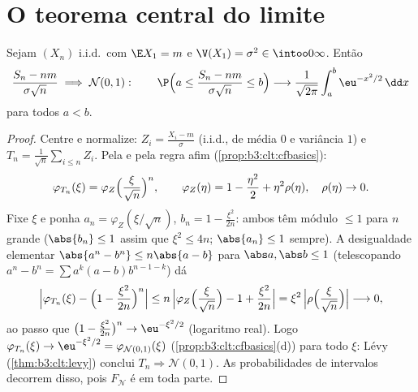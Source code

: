 \section{O teorema central do limite}

\begin{theorem}\label{thm:b3:clt:clt}
Sejam $(X_n)$ i.i.d.\ com $\E X_1 = m$ e $\V(X_1) =
\sigma^2 \in \intoo0\infty$. Então
\[
\frac{S_n - nm}{\sigma\sqrt n} \;\Longrightarrow\; \mathcal
N(0, 1) :
\qquad
\P\Bigl(a \leq \frac{S_n - nm}{\sigma\sqrt n} \leq
b\Bigr) \longrightarrow
\frac{1}{\sqrt{2\pi}}\int_a^b\eu^{-x^2/2}\,\dd x
\]
para todos $a < b$.
\end{theorem}

\begin{proof}
Centre e normalize: $Z_i = \frac{X_i - m}{\sigma}$ (i.i.d., de média $0$ e variância $1$)
e $T_n =
\frac1{\sqrt n}\sum_{i\leq n}Z_i$. Pela  e pela regra afim (\cref{prop:b3:clt:cfbasics}):
\[
\varphi_{T_n}(\xi) =
\varphi_{Z}\Bigl(\frac{\xi}{\sqrt n}\Bigr)^{n},
\qquad
\varphi_Z(\eta) = 1 - \frac{\eta^2}2 + \eta^2\rho(\eta),\quad
\rho(\eta)\to0 .
\]
Fixe $\xi$ e ponha $a_n = \varphi_Z(\xi/\sqrt n)$, $b_n = 1 -
\frac{\xi^2}{2n}$: ambos têm módulo $\leq 1$ para
$n$ grande ($\abs{b_n} \leq 1$ assim que $\xi^2 \leq 4n$; $\abs{a_n} \leq 1$ sempre). A desigualdade
elementar $\abs{a^n - b^n} \leq
n\abs{a - b}$ para $\abs a, \abs b \leq 1$ (telescopando $a^n - b^n = \sum a^k(a - b)b^{n-1-k}$) dá
\[
\Bigl|\varphi_{T_n}(\xi) - \Bigl(1 -
\frac{\xi^2}{2n}\Bigr)^{n}\Bigr|
\leq n\,\Bigl|\varphi_Z\Bigl(\frac\xi{\sqrt n}\Bigr) - 1 +
\frac{\xi^2}{2n}\Bigr|
= \xi^2\,\Bigl|\rho\Bigl(\frac{\xi}{\sqrt n}\Bigr)\Bigr|
\longrightarrow 0,
\]
ao passo que $\bigl(1 - \frac{\xi^2}{2n}\bigr)^n \to
\eu^{-\xi^2/2}$ (logaritmo real). Logo $\varphi_{T_n}(\xi) \to
\eu^{-\xi^2/2} = \varphi_{\mathcal N(0,1)}(\xi)$ (\cref{prop:b3:clt:cfbasics}(d))
para todo $\xi$: Lévy (\cref{thm:b3:clt:levy}) conclui $T_n \Rightarrow \mathcal
N(0,1)$. As
probabilidades de intervalos decorrem disso, pois $F_{\mathcal
N}$ é  em
toda parte.
\end{proof}

